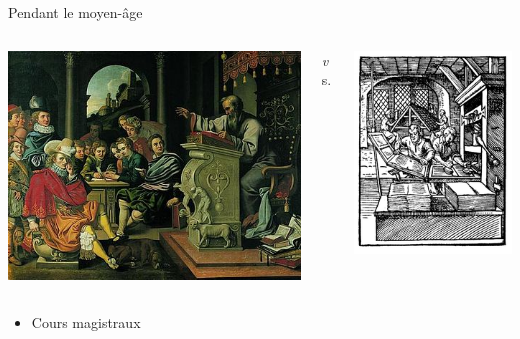 \begin{frame}{Pendant le moyen-âge}
\begin{columns}
	\begin{column}{0.40\linewidth}
		\centering
		\includegraphics[height=0.35\paperheight]{../resources/illustrations/lecture} \\
	\end{column}
	\begin{column}{0.09\linewidth} \centering \huge \emph vs. \end{column}
	\begin{column}{0.40\linewidth}
		\centering
		\includegraphics[height=0.35\paperheight]{../resources/illustrations/gutenberg} \\
	\end{column}
\end{columns}
\begin{columns}
	\begin{column}{0.49\linewidth}
		\begin{itemize}
			\item Cours magistraux

\end{itemize}
\end{column}
\end{columns}
\end{frame}
